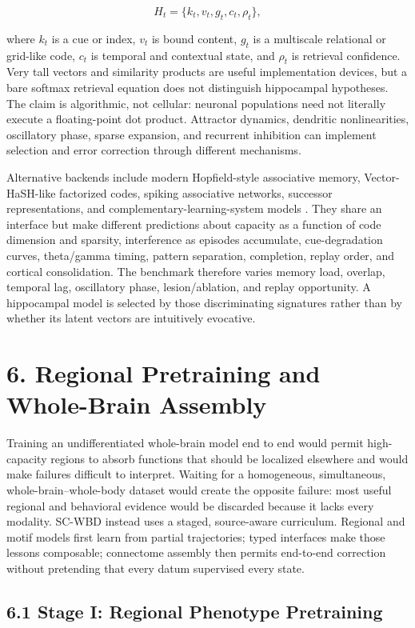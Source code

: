 \[
H_t=\{k_t,v_t,g_t,c_t,\rho_t\},
\]

where \(k_t\) is a cue or index, \(v_t\) is bound content, \(g_t\) is a
multiscale relational or grid-like code, \(c_t\) is temporal and contextual
state, and \(\rho_t\) is retrieval confidence. Very tall vectors and
similarity products are useful implementation devices, but a bare softmax
retrieval equation does not distinguish hippocampal hypotheses. The claim is
algorithmic, not cellular: neuronal populations need not literally execute a
floating-point dot product. Attractor dynamics, dendritic nonlinearities,
oscillatory phase, sparse expansion, and recurrent inhibition can implement
selection and error correction through different mechanisms.

Alternative backends include modern Hopfield-style associative memory,
Vector-HaSH-like factorized codes, spiking associative networks, successor
representations, and complementary-learning-system models
\citep{kumaran2016,ravichandran2024}. They share an interface but make
different predictions about capacity as a function of code dimension and
sparsity, interference as episodes accumulate, cue-degradation curves,
theta/gamma timing, pattern separation, completion, replay order, and cortical
consolidation. The benchmark therefore varies memory load, overlap, temporal
lag, oscillatory phase, lesion/ablation, and replay opportunity. A hippocampal
model is selected by those discriminating signatures rather than by whether
its latent vectors are intuitively evocative.

\section{6. Regional Pretraining and Whole-Brain Assembly}

Training an undifferentiated whole-brain model end to end would permit
high-capacity regions to absorb functions that should be localized elsewhere
and would make failures difficult to interpret. Waiting for a homogeneous,
simultaneous, whole-brain--whole-body dataset would create the opposite
failure: most useful regional and behavioral evidence would be discarded
because it lacks every modality. SC-WBD instead uses a staged, source-aware
curriculum. Regional and motif models first learn from partial trajectories;
typed interfaces make those lessons composable; connectome assembly then
permits end-to-end correction without pretending that every datum supervised
every state.

\subsection{6.1 Stage I: Regional Phenotype Pretraining}

